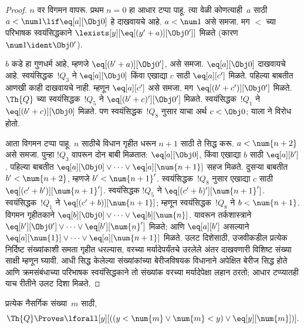 \documentclass[../../../include/open-logic-section]{subfiles}
\begin{document}
\begin{proof}
$n$ वर विगमन वापरू. प्रथम $n = 0$ हा आधार टप्पा पाहू.
त्या वेळी कोणत्याही~$a$ साठी $a < \num 1 \lif \eq[a][\Obj 0]$
हे दाखवायचे आहे. $a < \num 1$ असे समजा. मग $<$ च्या
परिभाषक स्वयंसिद्धकाने $\lexists[y][\eq[(y'+a)][\Obj 0']]$
मिळते (कारण $\num 1 \ident
\Obj 0'$).

$b$ कडे हा गुणधर्म आहे, म्हणजे $\eq[(b'+a)][\Obj 0']$,
असे समजा. $\eq[a][\Obj 0]$ दाखवायचे आहे. स्वयंसिद्धक~$!Q_3$
ने $\eq[a][\Obj 0]$ किंवा एखाद्या $c$ साठी
$\eq[a][c']$ मिळते. पहिल्या बाबतीत आणखी काही दाखवायचे नाही.
म्हणून $\eq[a][c']$ असे समजा. मग
$\eq[(b' + c')][\Obj 0']$ मिळते. $\Th{Q}$ च्या स्वयंसिद्धक~$!Q_5$
ने $\eq[(b'+c)'][\Obj 0']$ मिळते. स्वयंसिद्धक~$!Q_1$ ने
$\eq[(b' + c)][\Obj
0]$ मिळते. पण स्वयंसिद्धक~$!Q_8$ नुसार याचा अर्थ
$c < \Obj 0$; याला  ने विरोध होतो.

आता विगमन टप्पा पाहू. $n$ साठीचे विधान गृहीत धरून $n+1$
साठी ते सिद्ध करू. $a < \num {n+2}$ असे समजा. पुन्हा
$!Q_3$ वापरून दोन बाबी मिळतात: $\eq[a][\Obj 0]$, किंवा
एखाद्या $b$ साठी $\eq[a][b']$. पहिल्या बाबतीत
$\eq[a][\Obj 0] \lor \dots \lor
\eq[a][\num{n+1}]$ सहज मिळते. दुसऱ्या बाबतीत $b'
< \num {n+2}$, म्हणजे $b' < \num{n+1}'$. स्वयंसिद्धक~$!Q_8$
नुसार एखाद्या $c$ साठी
$\eq[(c'+b')][\num{n+1}']$. स्वयंसिद्धक $!Q_5$ ने
$\eq[(c'+b)'][\num{n+1}']$. स्वयंसिद्धक~$!Q_1$ ने
$\eq[(c'+b)][\num{n+1}]$; म्हणून स्वयंसिद्धक~$!Q_8$ ने
$b < \num{n+1}$. विगमन गृहीतकाने
$\eq[b][\Obj 0] \lor \dots \lor \eq[b][\num{n}]$.
यावरून तर्कशास्त्राने
$\eq[b'][\Obj 0'] \lor \dots \lor \eq[b'][\num{n}']$
मिळते; आणि $\eq[a][b']$ असल्याने
$\eq[a][\num{1}] \lor \dots \lor \eq[a][\num{n+1}]$
मिळते. उलट दिशेसाठी, उजवीकडील प्रत्येक निर्दिष्ट संख्यांकाशी
समता गृहीत धरल्यास, वरच्या मर्यादेपर्यंतचे उरलेले अंतर
दाखवणारी विशिष्ट संख्या साक्षी म्हणून घ्यावी. आधी सिद्ध
केलेल्या संख्यांकांच्या बेरीजविषयक विधानाने अपेक्षित बेरीज
सिद्ध होते आणि क्रमसंबंधाच्या परिभाषक स्वयंसिद्धकाने तो संख्यांक
वरच्या मर्यादेपेक्षा लहान ठरतो;
आधार टप्प्यातही याच रीतीने उलट दिशा मिळते.
\end{proof}

\begin{lem}
   प्रत्येक नैसर्गिक संख्या~$m$ साठी,
  \[
  \Th{Q} \Proves
  \lforall[y][((y < \num{m} \lor \num{m} < y) \lor \eq[y][\num{m}])].
  \]
\end{lem}
\end{document}
